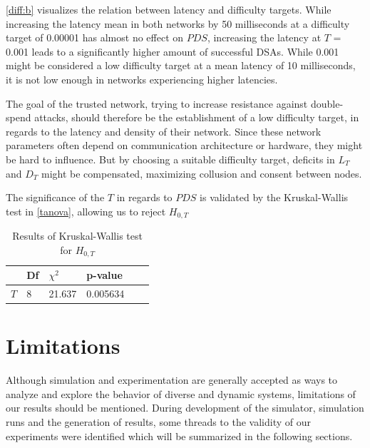 \documentclass[a4paper,12pt,twoside]{report}
\begin{document}
\autoref{diff:b} visualizes the relation between latency and difficulty targets. While increasing the latency mean in both networks by 50 milliseconds at a difficulty target of 0.00001 has almost no effect on $PDS$, increasing the latency at $T$ = 0.001 leads to a significantly higher amount of successful DSAs. While 0.001 might be considered a low difficulty target at a mean latency of 10 milliseconds, it is not low enough in networks experiencing higher latencies. 

The goal of the trusted network, trying to increase resistance against double-spend attacks, should therefore be the establishment of a low difficulty target, in regards to the latency and density of their network. Since these network parameters often depend on communication architecture or hardware, they might be hard to influence. But by choosing a suitable difficulty target, deficits in $L_{T}$ and $D_{T}$ might be compensated, maximizing collusion and consent between nodes.

The significance of the $T$ in regards to $PDS$ is validated by the Kruskal-Wallis test in \autoref{tanova}, allowing us to reject $H_{0,T}$
\begin{table}[hb]
\centering
\begin{tabular}{|l|l|l|l|l|l|} \hline
& Df & $\chi^{2}$ & p-value \\ \hline
$T$ & 8 &  21.637 & 0.005634 \\ \hline
\end{tabular}
\caption{Results of Kruskal-Wallis test for $H_{0,T}$}
\label{tanova}
\end{table}

\section{Limitations}
Although simulation and experimentation are generally accepted as ways to analyze
and explore the behavior of diverse and dynamic systems, limitations of our results should be mentioned. During development of the simulator, simulation runs and the generation of results, some threads to the validity of our experiments were identified which will be summarized in the following sections. 
\end{document}
